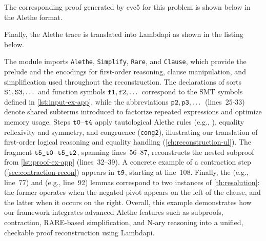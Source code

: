 

The corresponding proof generated by \textsf{cvc5} for this problem is shown below in the Alethe format.



Finally, the Alethe trace is translated into Lambdapi as shown in the listing below.



The module imports \texttt{Alethe}, \texttt{Simplify}, \texttt{Rare}, and \texttt{Clause}, which provide the prelude and the encodings for first-order reasoning, clause manipulation, and simplification used throughout the reconstruction. 
The declarations of sorts \(\texttt{\upshape{S1}}, \texttt{\upshape{S3}}, \dots\) and function symbols \(\texttt{\upshape{f1}}, \texttt{\upshape{f2}}, \dots\) correspond to the SMT symbols defined in \cref{lst:input-ex-app}, while the abbreviations \(\texttt{\upshape{p2}}, \texttt{\upshape{p3}}, \dots\) (lines~25-33) denote shared subterms introduced to factorize repeated expressions and optimize memory usage.
Steps \(\texttt{\upshape{t0}}\)–\(\texttt{\upshape{t4}}\) apply tautological Alethe rules (e.g., ), equality reflexivity and symmetry, and congruence (\texttt{cong2}), illustrating our translation of first-order logical reasoning and equality handling (\cref{ch:reconstruction-ul}). 
The fragment \(\texttt{\upshape{t5\_t0}}\)–\(\texttt{\upshape{t5\_t2}}\), spanning lines~56–87, reconstructs the nested subproof from \cref{lst:proof-ex-app} (lines~32–39).
A concrete example of a contraction step (\cref{sec:contraction-recon}) appears in \(\texttt{\upshape{t9}}\), starting at line~108.
Finally, the  (e.g., line~77) and  (e.g., line~92) lemmas correspond to two instances of \cref{th:resolution}: the former operates when the negated pivot appears on the left of the clause, and the latter when it occurs on the right.
Overall, this example demonstrates how our framework integrates advanced Alethe features such as subproofs, contraction, RARE-based simplification, and N-ary reasoning into a unified, checkable proof reconstruction using Lambdapi.